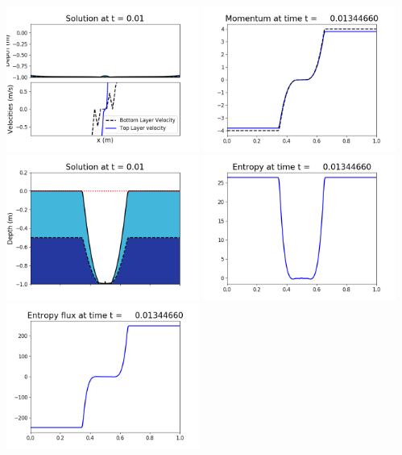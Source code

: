 \documentclass[11pt]{article}
\begin{document}
\includegraphics[width=0.475\textwidth]{frame0084fig1002.png}
\vskip 10pt 
\includegraphics[width=0.475\textwidth]{frame0084fig1003.png}
\includegraphics[width=0.475\textwidth]{frame0084fig1006.png}
\vskip 10pt 
\includegraphics[width=0.475\textwidth]{frame0084fig1007.png}
\includegraphics[width=0.475\textwidth]{frame0084fig1008.png}
\end{document}
